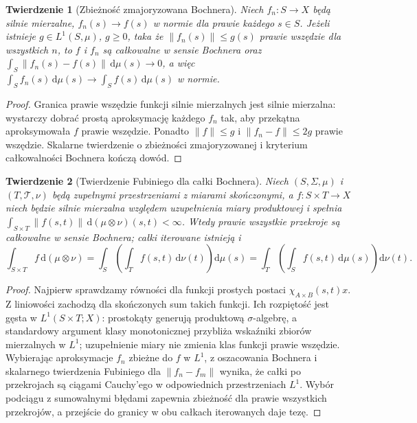 \documentclass[11pt,a4paper]{article}
\numberwithin{equation}{section}
\theoremstyle{plain}
\newtheorem{twierdzenie}{Twierdzenie}[section]
\theoremstyle{definition}
\theoremstyle{remark}
\begin{document}
\begin{twierdzenie}[Zbieżność zmajoryzowana Bochnera]
\label{thm:bochner-dct15b}
Niech $f_n:S\to X$ będą silnie mierzalne,
$f_n(s)\to f(s)$ w normie dla prawie każdego $s\in S$.
Jeżeli istnieje $g\in L^1(S,\mu)$, $g\ge0$, taka że
$\|f_n(s)\|\le g(s)$ prawie wszędzie dla wszystkich $n$,
to $f$ i $f_n$ są całkowalne w sensie Bochnera oraz
$\int_S\|f_n(s)-f(s)\|\,\mathrm d\mu(s)\to0$, a więc
$\int_S f_n(s)\,\mathrm d\mu(s)\to\int_S f(s)\,\mathrm d\mu(s)$ w normie.
\end{twierdzenie}
\begin{proof}
Granica prawie wszędzie funkcji silnie mierzalnych jest
silnie mierzalna: wystarczy dobrać prostą aproksymację
każdego $f_n$ tak, aby przekątna aproksymowała $f$ prawie
wszędzie. Ponadto $\|f\|\le g$ i
$\|f_n-f\|\le2g$ prawie wszędzie. Skalarne twierdzenie
o zbieżności zmajoryzowanej i kryterium całkowalności
Bochnera kończą dowód.
\end{proof}

\begin{twierdzenie}[Twierdzenie Fubiniego dla całki Bochnera]
\label{thm:bochner-fubini15b}
Niech $(S,\Sigma,\mu)$ i $(T,\mathcal T,\nu)$ będą
zupełnymi przestrzeniami z miarami skończonymi, a
$f:S\times T\to X$ niech będzie silnie mierzalna względem
uzupełnienia miary produktowej i spełnia
$\int_{S\times T}\|f(s,t)\|\,\mathrm d(\mu\otimes\nu)(s,t)<\infty$.
Wtedy prawie wszystkie przekroje są całkowalne w sensie
Bochnera; całki iterowane istnieją i
\[
 \int_{S\times T}f\,\mathrm d(\mu\otimes\nu)
 =\int_S\left(\int_Tf(s,t)\,\mathrm d\nu(t)\right)\mathrm d\mu(s)
 =\int_T\left(\int_Sf(s,t)\,\mathrm d\mu(s)\right)\mathrm d\nu(t).
\]
\end{twierdzenie}
\begin{proof}
Najpierw sprawdzamy równości dla funkcji prostych postaci
$\chi_{A\times B}(s,t)x$. Z liniowości zachodzą dla
skończonych sum takich funkcji. Ich rozpiętość jest gęsta
w $L^1(S\times T;X)$: prostokąty generują produktową
$\sigma$-algebrę, a standardowy argument klasy monotonicznej
przybliża wskaźniki zbiorów mierzalnych w $L^1$;
uzupełnienie miary nie zmienia klas funkcji prawie wszędzie.
Wybierając aproksymacje $f_n$ zbieżne do $f$ w $L^1$,
z oszacowania Bochnera i skalarnego twierdzenia Fubiniego
dla $\|f_n-f_m\|$ wynika, że całki po przekrojach są
ciągami Cauchy'ego w odpowiednich przestrzeniach $L^1$.
Wybór podciągu z sumowalnymi błędami zapewnia zbieżność
dla prawie wszystkich przekrojów, a przejście do granicy
w obu całkach iterowanych daje tezę.
\end{proof}
\end{document}
